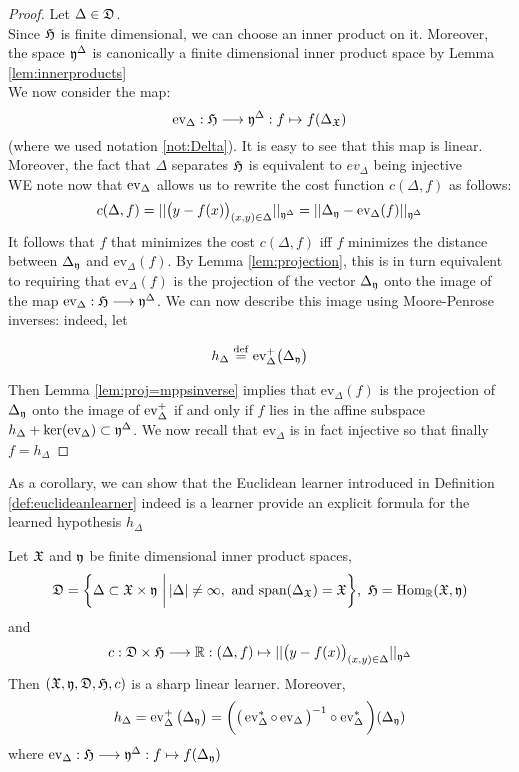 \begin{proof}
Let $\Delta\in \mathfrak{D}$.\\
Since $\mathfrak{H}$ is finite dimensional, we can choose an inner product on it.  Moreover, the space $\mathfrak{y}^\Delta$ is canonically a finite dimensional inner product space by Lemma \ref{lem:innerproducts}\\
We now consider the map:
\[
\textrm{ev}_\Delta: \mathfrak{H}\longrightarrow \mathfrak{y}^\Delta: f \mapsto f(\Delta_{\mathfrak{X}})
\]
(where we used notation \ref{not:Delta}). It is easy to see that this map is linear. Moreover, the fact that  $\Delta$ separates $\mathfrak{H}$ is equivalent to $ev_\Delta$ being injective\\
WE note now that $\operatorname{ev}_\Delta$  allows us to rewrite the cost function $c(\Delta,f)$ as follows:
\[
c(\Delta,f)=\vert \vert \big(y-f(x)\big)_{(x,y)\in \Delta}\vert \vert_{\mathfrak{y}^\Delta}=\vert \vert \Delta_{\mathfrak{y}}-\textrm{ev}_\Delta(f)\vert \vert_{\mathfrak{y}^\Delta}
\]
It follows that $f$ that minimizes the cost $c(\Delta, f)$ iff $f$ minimizes the distance between $\Delta_{\mathfrak{y}}$ and  $\textrm{ev}_\Delta(f)$. By Lemma \ref{lem:projection}, this is in turn equivalent to requiring that $\textrm{ev}_\Delta(f)$ is the projection of the vector $\Delta_{\mathfrak{y}}$ onto the image of the map $\textrm{ev}_\Delta:\mathfrak{H}\longrightarrow \mathfrak{y}^\Delta$. We can now describe this image using Moore-Penrose inverses: indeed, let

\[
h_\Delta \stackrel{\operatorname{def}}{=}\textrm{ev}_\Delta^+\big(\Delta_{\mathfrak{y}}\big)
\]

 Then Lemma \ref{lem:proj=mppsinverse} implies that $\textrm{ev}_\Delta(f)$ is the projection of $\Delta_{\mathfrak{y}}$ onto the image of $\operatorname{ev}_\Delta^+$ if and only if $f$  lies in the affine subspace $h_\Delta+\ker(\textrm{ev}_\Delta)\subset \mathfrak{y}^\Delta$. We now recall that $\textrm{ev}_\Delta$ is in fact injective  so that finally $
f = h_\Delta
$
\end{proof}

As a corollary, we can show that the Euclidean learner introduced in Definition \ref{def:euclideanlearner} indeed is a learner provide an explicit formula for the learned hypothesis $h_\Delta$
\begin{corollary}\label{cor:euclideanlearners}
Let $\mathfrak{X}$ and $\mathfrak{y}$ be finite dimensional inner product spaces, 	
\[
\mathfrak{D} = \bigg\{ \Delta \subset \mathfrak{X}\times \mathfrak{y}\,\,\bigg\vert\,  \vert \Delta \vert \neq \infty , \textrm{ and span}(\Delta_{\mathfrak{X}}) = \mathfrak{X}\bigg\}
\text{,}\,\,\, \mathfrak{H}=\operatorname{Hom}_{\mathbb{R}}(\mathfrak{X},\mathfrak{y})
\]
and 
\[
c:\mathfrak{D}\times \mathfrak{H}\longrightarrow \mathbb{R}:(\Delta,f)\mapsto \vert \vert \big( y-f(x)\big)_{(x,y)\in \Delta} \vert \vert_{\mathfrak{y}^\Delta} 
\]
Then $(\mathfrak{X},\mathfrak{y},\mathfrak{D},\mathfrak{H},c)$ is a sharp linear learner. Moreover, 
\[
h_\Delta = \operatorname{ev}_\Delta^+\big(\Delta_{\mathfrak{y}}\big)=\bigg(\big(\operatorname{ev}_\Delta^*\circ \operatorname{ev}_\Delta\big)^{-1}\circ \operatorname{ev}_\Delta^*\bigg)(\Delta_{\mathfrak{y}})
\]
where $\operatorname{ev}_\Delta:\mathfrak{H}\longrightarrow \mathfrak{y}^\Delta: f \mapsto f(\Delta_{\mathfrak{y}})$
\end{corollary}

